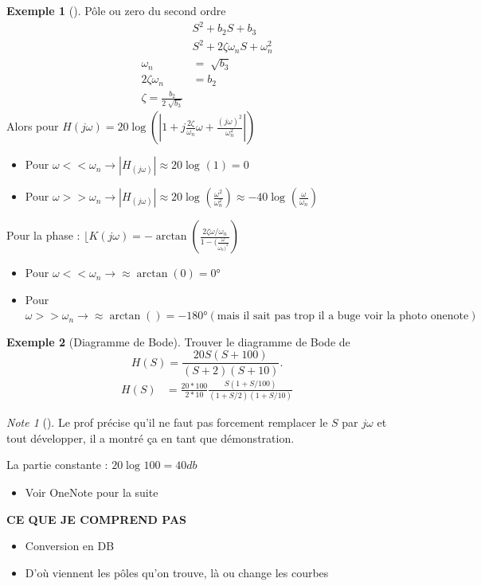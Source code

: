 \documentclass{article}
\theoremstyle{plain}%
\theoremstyle{definition}
\newtheorem{exmp}{Exemple}[section]
\theoremstyle{remark}
\newtheorem*{note}{Note}
\begin{document}
\begin{exmp}[]
    Pôle ou zero du second ordre 
    \begin{align*}
        & S^2 + b_2 S + b_3 \\
        & S^2 + 2 \zeta \omega _n S + \omega _n ^2\\
        \omega _n &= \sqrt[]{b_3} \\
        2 \zeta \omega _n &= b_2 \\
        \zeta = \frac{b_2}{2 \sqrt[]{b_3}}
    \end{align*}
    Alors pour $ H(j \omega ) = 20 \log (\left| 1 + j \frac{2 \zeta }{\omega_n} \omega  + \frac{(j \omega )^2}{\omega _n^2}\right| ) $ \begin{itemize}
        \item Pour $ \omega << \omega _n \rightarrow \left| H_(j \omega ) \right| \approx 20 \log_{} (1) = 0  $ 
        \item Pour $ \omega >> \omega _n \rightarrow \left| H_(j \omega  )\right| \approx 20 \log_{} (\frac{\omega ^2}{\omega _n ^2}) \approx - 40 \log_{} (\frac{\omega }{\omega _n}) $ 
    \end{itemize}
    Pour la phase : $ \lfloor K(j \omega ) = - \arctan (\frac{2 \zeta \omega / \omega _n}{1 - (\frac{\omega}{\omega _n)^2 }}) $ \begin{itemize}
        \item Pour $ \omega << \omega _n \rightarrow \approx \arctan (0) = 0 \text{°} $ 
        \item Pour $ \omega >> \omega _n \rightarrow \approx \arctan () = -180\text{°} (\text{mais il sait pas trop il a buge voir la photo onenote})$ 
    \end{itemize}
\end{exmp}

\begin{exmp}[Diagramme de Bode]
    Trouver le diagramme de Bode de 
    \[
        H(S) = \frac{20 S (S + 100)}{(S + 2)(S + 10)}
    .\]
    \begin{align*}
        H(S) &= \frac{20 * 100}{2 * 10} \frac{S (1 + S/100)}{(1 + S/2) (1 + S/10)}
    \end{align*}
    \begin{note}[]
        Le prof précise qu'il ne faut pas forcement remplacer le $ S $ par $ j \omega  $ et tout développer, il a montré ça en tant que démonstration. 
    \end{note}
    La partie constante : $ 20 \log_{} 100 = 40db $\begin{itemize}
        \item Voir OneNote pour la suite
    \end{itemize}
    \textbf{CE QUE JE COMPREND PAS}
    \begin{itemize}
        \item Conversion en DB
        \item D'où viennent les pôles qu'on trouve, là ou change les courbes
    \end{itemize}
\end{exmp}
\end{document}
